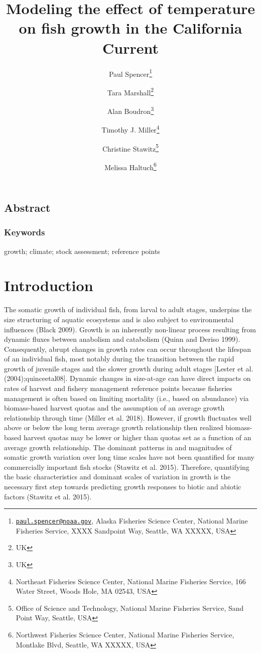 \documentclass[
]{article}
\title{Modeling the effect of temperature on fish growth in the
California Current}
\author{Paul Spencer\footnote{\href{mailto:paul.spencer@noaa.gov}{\nolinkurl{paul.spencer@noaa.gov}},
  Alaska Fisheries Science Center, National Marine Fisheries Service,
  XXXX Sandpoint Way, Seattle, WA XXXXX, USA} \and Tara
Marshall\footnote{UK} \and Alan Boudron\footnote{UK} \and Timothy J.
Miller\footnote{Northeast Fisheries Science Center, National Marine
  Fisheries Service, 166 Water Street, Woods Hole, MA 02543, USA} \and Christine
Stawitz\footnote{Office of Science and Technology, National Marine
  Fisheries Service, Sand Point Way, Seattle, USA} \and Melissa
Haltuch\footnote{Northwest Fisheries Science Center, National Marine
  Fisheries Service, Montlake Blvd, Seattle, WA XXXXX, USA}}
\date{}
\begin{document}
\maketitle

\pagebreak

\hypertarget{abstract}{%
\subsection*{Abstract}\label{abstract}}

\hypertarget{keywords}{%
\subsubsection*{Keywords}\label{keywords}}

growth; climate; stock assessment; reference points

\pagebreak

\hypertarget{introduction}{%
\section{Introduction}\label{introduction}}

The somatic growth of individual fish, from larval to adult stages,
underpins the size structuring of aquatic ecosystems and is also subject
to environmental influences (Black 2009). Growth is an inherently
non-linear process resulting from dynamic fluxes between anabolism and
catabolism (Quinn and Deriso 1999). Consequently, abrupt changes in
growth rates can occur throughout the lifespan of an individual fish,
most notably during the transition between the rapid growth of juvenile
stages and the slower growth during adult stages {[}Lester et al.
(2004);quinceetal08{]}. Dynamic changes in size-at-age can have direct
impacts on rates of harvest and fishery management reference points
because fisheries management is often based on limiting mortality (i.e.,
based on abundance) via biomass-based harvest quotas and the assumption
of an average growth relationship through time (Miller et al. 2018).
However, if growth fluctuates well above or below the long term average
growth relationship then realized biomass-based harvest quotas may be
lower or higher than quotas set as a function of an average growth
relationship. The dominant patterns in and magnitudes of somatic growth
variation over long time scales have not been quantified for many
commercially important fish stocks (Stawitz et al. 2015). Therefore,
quantifying the basic characteristics and dominant scales of variation
in growth is the necessary first step towards predicting growth
responses to biotic and abiotic factors (Stawitz et al. 2015).
\end{document}

